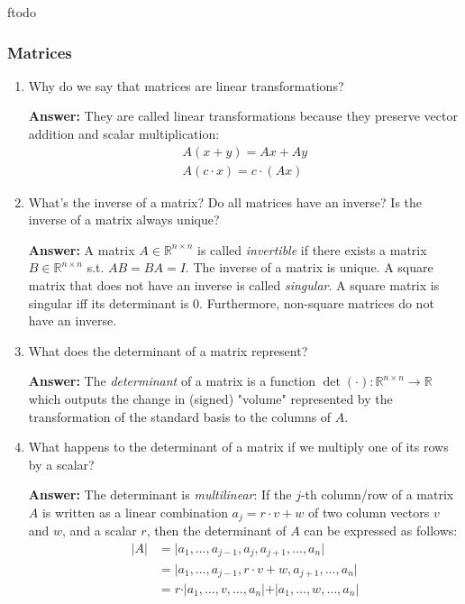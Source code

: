 ƒtodo\documentclass{article}
\newenvironment{QandA}{\begin{enumerate}[label=\arabic*.]}{\end{enumerate}}
\newenvironment{answer}{\par\normalfont \textbf{Answer:}}{}
\newcommand{\R}{\mathbb{R}}
\begin{document}
\subsubsection{Matrices}
\begin{QandA}
    \item Why do we say that matrices are linear transformations?
    \begin{answer}
        They are called linear transformations because they preserve vector addition and scalar multiplication:
        \begin{align*}
            A(x+y) = Ax + Ay \\
            A(c \cdot x) = c \cdot (Ax)
        \end{align*}
    \end{answer}
    
    \item What’s the inverse of a matrix? Do all matrices have an inverse? Is the inverse of a matrix always unique?
    \begin{answer}
        A matrix $A \in \R^{n \times n}$ is called \textit{invertible} if there exists a matrix $B \in \R^{n \times n}$ s.t. $AB = BA = I$. The inverse of a matrix is unique. A square matrix that does not have an inverse is called \textit{singular}. A square matrix is singular iff its determinant is 0. Furthermore, non-square matrices do not have an inverse.
    \end{answer}
    
    \item What does the determinant of a matrix represent?
    \begin{answer}
        The \textit{determinant} of a matrix is a function $\det(\cdot): \R^{n \times n} \rightarrow \R$ which outputs the change in (signed) "volume" represented by the transformation of the standard basis to the columns of $A$.
    \end{answer}
    
    \item What happens to the determinant of a matrix if we multiply one of its rows by a scalar?
    \begin{answer}
        The determinant is \textit{multilinear}: If the $j$-th column/row of a matrix $A$ is written as a linear combination $a_j = r \cdot v + w$ of two column vectors $v$ and $w$, and a scalar $r$, then the determinant of $A$ can be expressed as follows:
        \begin{align*}
            \vert A \vert &= \vert a_1, \ldots, a_{j-1}, a_j, a_{j+1}, \ldots, a_n \vert \\
            &= \vert a_1, \ldots, a_{j-1}, r \cdot v + w, a_{j+1}, \ldots, a_n \vert \\
            &= r \cdot \vert a_1, \ldots, v, \ldots, a_n \vert + \vert a_1, \ldots, w, \ldots, a_n \vert 
        \end{align*}
    \end{answer}
    

\end{QandA}
\end{document}

